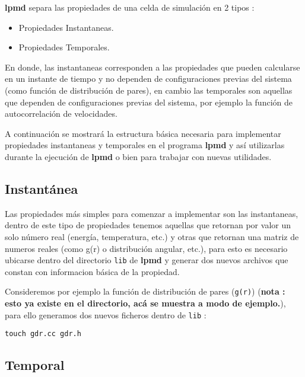 \documentclass[a4paper,10pt]{scrbook}
\newcommand{\lpmd}{\textbf{lpmd }}
\begin{document}
\lpmd separa las propiedades de una celda de simulaci\'on en 2 tipos :

\begin{itemize}
 \item Propiedades Instantaneas.
 \item Propiedades Temporales.
\end{itemize}

En donde, las instantaneas corresponden a las propiedades que pueden calcularse en un instante de tiempo y no dependen de configuraciones previas del sistema (como funci\'on de distribuci\'on de pares), en cambio las temporales son aquellas que dependen de configuraciones previas del sistema, por ejemplo la funci\'on de autocorrelaci\'on de velocidades.

A continuaci\'on se mostrar\'a la estructura b\'asica necesaria para implementar propiedades instantaneas y temporales en el programa \lpmd y as\'i utilizarlas durante la ejecuci\'on de \lpmd o bien para trabajar con nuevas utilidades.

\subsection{Instant\'anea}

Las propiedades m\'as simples para comenzar a implementar son las instantaneas, dentro de este tipo de propiedades tenemos aquellas que retornan por valor un solo n\'umero real (energ\'ia, temperatura, etc.) y otras que retornan una matriz de numeros reales (como g(r) o distribuci\'on angular, etc.), para esto es necesario ubicarse dentro del directorio \verb|lib| de \lpmd y generar dos nuevos archivos que constan con informacion b\'asica de la propiedad.

Consideremos por ejemplo la funci\'on de distribuci\'on de pares (\verb|g(r)|) (\textbf{nota : esto ya existe en el directorio, ac\'a se muestra a modo de ejemplo.}), para ello generamos dos nuevos ficheros dentro de \verb|lib| :

\begin{center}
 \verb|touch gdr.cc gdr.h|
\end{center}

\subsection{Temporal}
\end{document}
